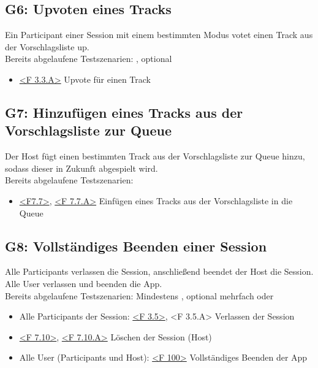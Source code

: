 \documentclass[oneside, ngerman]{sdqtechreport}
\begin{document}
\subsection{G6: Upvoten eines Tracks}
\label{subsec:Tests:GrundlegendeTestszenarien:G6}
\hypertarget{G6}{}
\newcommand{\gSix}{\hyperlink{G6}{G6: Upvoten eines Tracks }}
Ein Participant einer Session mit einem bestimmten Modus votet einen Track aus der Vorschlagsliste up. \\
Bereits abgelaufene Testszenarien: \gFour, optional \gThree
\begin{itemize}
    \item \hyperlink{<F 3.3.A>}{<F 3.3.A>} Upvote für einen Track
\end{itemize}

\subsection{G7: Hinzufügen eines Tracks aus der Vorschlagsliste zur Queue}
\label{subsec:Tests:GrundlegendeTestszenarien:G7}
\hypertarget{G7}{}
\newcommand{\gSeven}{\hyperlink{G7}{G7: Hinzufügen eines Tracks aus der Vorschlagsliste zur Queue }}
Der Host fügt einen bestimmten Track aus der Vorschlagsliste zur Queue hinzu, sodass dieser in Zukunft abgespielt wird. \\
Bereits abgelaufene Testszenarien: \gOne
\begin{itemize}
    \item \hyperlink{<F7.7>}{<F7.7>}, \hyperlink{<F 7.7.A>}{<F 7.7.A>} Einfügen eines Tracks aus der Vorschlagsliste in die Queue
\end{itemize}

\subsection{G8: Vollständiges Beenden einer Session}
\label{subsec:Tests:GrundlegendeTestszenarien:G8}
\hypertarget{G8}{}
\newcommand{\gEight}{\hyperlink{G8}{G8: Vollständiges Beenden einer Session }}
Alle Participants verlassen die Session, anschließend beendet der Host die Session. Alle User verlassen und beenden die App. \\
Bereits abgelaufene Testszenarien: Mindestens \gOne, optional mehrfach \gTwo oder \gThree
\begin{itemize}
    \item Alle Participants der Session: \hyperlink{<F 3.5>}{<F 3.5>}, <F 3.5.A> Verlassen der Session
    \item \hyperlink{<F 7.10>}{<F 7.10>}, \hyperlink{<F 7.10.A>}{<F 7.10.A>} Löschen der Session (Host)
    \item Alle User (Participants und Host): \hyperlink{<F 100>}{<F 100>} Vollständiges Beenden der App
\end{itemize}
\end{document}
